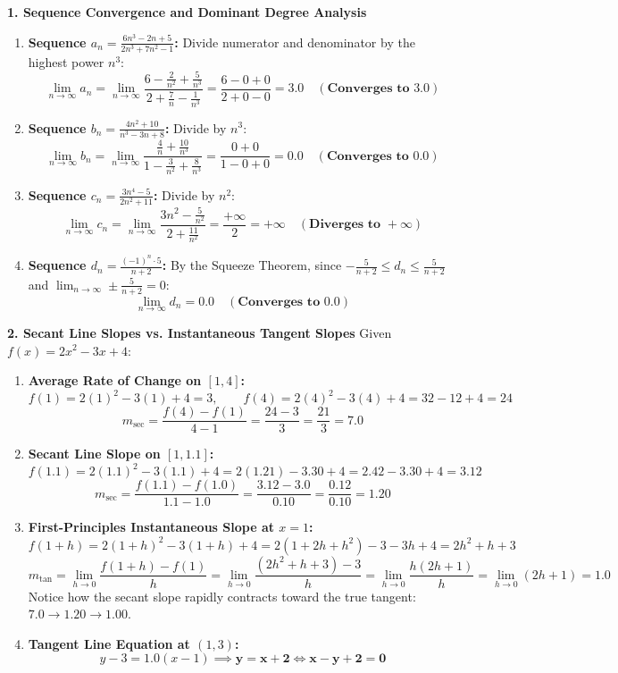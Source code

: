 \textbf{1. Sequence Convergence and Dominant Degree Analysis}
\begin{enumerate}
    \item \textbf{Sequence $a_n = \frac{6n^3 - 2n + 5}{2n^3 + 7n^2 - 1}$:}
    Divide numerator and denominator by the highest power $n^3$:
    $$\lim_{n \to \infty} a_n = \lim_{n \to \infty} \frac{6 - \frac{2}{n^2} + \frac{5}{n^3}}{2 + \frac{7}{n} - \frac{1}{n^3}} = \frac{6 - 0 + 0}{2 + 0 - 0} = \mathbf{3.0 \quad (\text{Converges to } 3.0)}$$
    \item \textbf{Sequence $b_n = \frac{4n^2 + 10}{n^3 - 3n + 8}$:}
    Divide by $n^3$:
    $$\lim_{n \to \infty} b_n = \lim_{n \to \infty} \frac{\frac{4}{n} + \frac{10}{n^3}}{1 - \frac{3}{n^2} + \frac{8}{n^3}} = \frac{0 + 0}{1 - 0 + 0} = \mathbf{0.0 \quad (\text{Converges to } 0.0)}$$
    \item \textbf{Sequence $c_n = \frac{3n^4 - 5}{2n^2 + 11}$:}
    Divide by $n^2$:
    $$\lim_{n \to \infty} c_n = \lim_{n \to \infty} \frac{3n^2 - \frac{5}{n^2}}{2 + \frac{11}{n^2}} = \frac{+\infty}{2} = \mathbf{+\infty \quad (\text{Diverges to } +\infty)}$$
    \item \textbf{Sequence $d_n = \frac{(-1)^n \cdot 5}{n + 2}$:}
    By the Squeeze Theorem, since $-\frac{5}{n + 2} \le d_n \le \frac{5}{n + 2}$ and $\lim_{n \to \infty} \pm \frac{5}{n + 2} = 0$:
    $$\lim_{n \to \infty} d_n = \mathbf{0.0 \quad (\text{Converges to } 0.0)}$$
\end{enumerate}

\textbf{2. Secant Line Slopes vs. Instantaneous Tangent Slopes}
Given $f(x) = 2x^2 - 3x + 4$:
\begin{enumerate}
    \item \textbf{Average Rate of Change on $[1, 4]$:}
    $$f(1) = 2(1)^2 - 3(1) + 4 = 3, \qquad f(4) = 2(4)^2 - 3(4) + 4 = 32 - 12 + 4 = 24$$
    $$m_{\text{sec}} = \frac{f(4) - f(1)}{4 - 1} = \frac{24 - 3}{3} = \frac{21}{3} = \mathbf{7.0}$$
    \item \textbf{Secant Line Slope on $[1, 1.1]$:}
    $$f(1.1) = 2(1.1)^2 - 3(1.1) + 4 = 2(1.21) - 3.30 + 4 = 2.42 - 3.30 + 4 = 3.12$$
    $$m_{\text{sec}} = \frac{f(1.1) - f(1.0)}{1.1 - 1.0} = \frac{3.12 - 3.0}{0.10} = \frac{0.12}{0.10} = \mathbf{1.20}$$
    \item \textbf{First-Principles Instantaneous Slope at $x = 1$:}
    $$f(1 + h) = 2(1 + h)^2 - 3(1 + h) + 4 = 2(1 + 2h + h^2) - 3 - 3h + 4 = 2h^2 + h + 3$$
    $$m_{\text{tan}} = \lim_{h \to 0} \frac{f(1+h) - f(1)}{h} = \lim_{h \to 0} \frac{(2h^2 + h + 3) - 3}{h} = \lim_{h \to 0} \frac{h(2h + 1)}{h} = \lim_{h \to 0} (2h + 1) = \mathbf{1.0}$$
    Notice how the secant slope rapidly contracts toward the true tangent: $7.0 \to 1.20 \to 1.00$.
    \item \textbf{Tangent Line Equation at $(1, 3)$:}
    $$y - 3 = 1.0(x - 1) \implies \mathbf{y = x + 2 \iff x - y + 2 = 0}$$
\end{enumerate}

